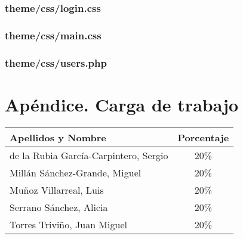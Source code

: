 \documentclass[12pt,a4paper,titlepage,spanish,twoside]{book}
\begin{document}
\subsection{theme/css/login.css}


\subsection{theme/css/main.css}


\subsection{theme/css/users.php}


\chapter*{Apéndice. Carga de trabajo}
\begin{center}
  \begin{tabular}{p{10cm}|c}
    \textbf{Apellidos y Nombre} & \textbf{Porcentaje} \\ \hline \hline
    de la Rubia García-Carpintero, Sergio & 20\% \\ \hline
    Millán Sánchez-Grande, Miguel & 20\% \\ \hline
    Muñoz Villarreal, Luis & 20\% \\ \hline
    Serrano Sánchez, Alicia & 20\% \\ \hline
    Torres Triviño, Juan Miguel & 20\%
  \end{tabular}
\end{center}

 

\end{document}
